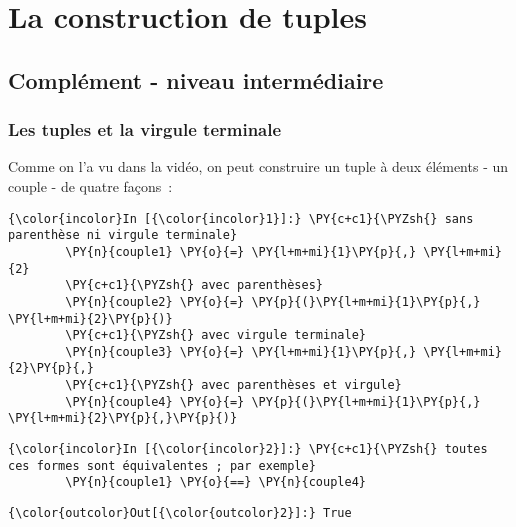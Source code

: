     
    
    
    

    

    \hypertarget{la-construction-de-tuples}{%
\section{La construction de tuples}\label{la-construction-de-tuples}}

    \hypertarget{compluxe9ment---niveau-intermuxe9diaire}{%
\subsection{Complément - niveau
intermédiaire}\label{compluxe9ment---niveau-intermuxe9diaire}}

    \hypertarget{les-tuples-et-la-virgule-terminale}{%
\subsubsection{Les tuples et la virgule
terminale}\label{les-tuples-et-la-virgule-terminale}}

    Comme on l'a vu dans la vidéo, on peut construire un tuple à deux
éléments - un couple - de quatre façons~:

    \begin{Verbatim}[commandchars=\\\{\}]
{\color{incolor}In [{\color{incolor}1}]:} \PY{c+c1}{\PYZsh{} sans parenthèse ni virgule terminale}
        \PY{n}{couple1} \PY{o}{=} \PY{l+m+mi}{1}\PY{p}{,} \PY{l+m+mi}{2}
        \PY{c+c1}{\PYZsh{} avec parenthèses}
        \PY{n}{couple2} \PY{o}{=} \PY{p}{(}\PY{l+m+mi}{1}\PY{p}{,} \PY{l+m+mi}{2}\PY{p}{)}
        \PY{c+c1}{\PYZsh{} avec virgule terminale}
        \PY{n}{couple3} \PY{o}{=} \PY{l+m+mi}{1}\PY{p}{,} \PY{l+m+mi}{2}\PY{p}{,}
        \PY{c+c1}{\PYZsh{} avec parenthèses et virgule}
        \PY{n}{couple4} \PY{o}{=} \PY{p}{(}\PY{l+m+mi}{1}\PY{p}{,} \PY{l+m+mi}{2}\PY{p}{,}\PY{p}{)}
\end{Verbatim}


    \begin{Verbatim}[commandchars=\\\{\}]
{\color{incolor}In [{\color{incolor}2}]:} \PY{c+c1}{\PYZsh{} toutes ces formes sont équivalentes ; par exemple}
        \PY{n}{couple1} \PY{o}{==} \PY{n}{couple4}
\end{Verbatim}


\begin{Verbatim}[commandchars=\\\{\}]
{\color{outcolor}Out[{\color{outcolor}2}]:} True
\end{Verbatim}
            
